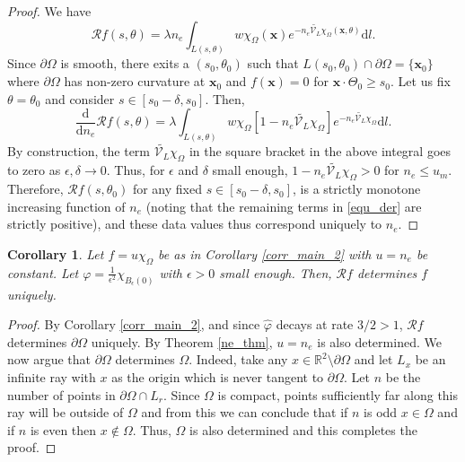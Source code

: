 \documentclass[a4paper,12pt]{amsart}
\numberwithin{equation}{section}
\theoremstyle{plain}
\numberwithin{theorem}{section}
\newtheorem{corollary}[theorem]{Corollary}
\theoremstyle{definition}
\theoremstyle{remark}
\theoremstyle{remark}
\theoremstyle{remark}
\newcommand{\vx}{{\mathbf{x}}}
\newcommand{\seanc}[1]{\begin{quotation}\textbf{Sean's comment:\
}{\textit{#1}}\end{quotation}}
\begin{document}

\begin{proof}
We have
\begin{equation}
\mathcal{R}f(s,\theta) = \lambda n_e\int_{L(s,\theta)}w \chi_\Omega(\vx) e^{-n_e \widetilde{ \mathcal{V}_L }\chi_\Omega(\vx, \theta)}\mathrm{d}l.
\end{equation}
Since $\partial \Omega$ is smooth, there exits a $(s_0,\theta_0)$ such that $L(s_0,\theta_0) \cap \partial \Omega = \{\vx_0\}$ where $\partial \Omega$ has non-zero curvature at $\vx_0$ and $f(\vx) = 0$ for $\vx \cdot \Theta_0 \geq s_0$. Let us fix $\theta = \theta_0$ and consider $s\in [s_0-\delta,s_0]$. Then,
\begin{equation}
\label{equ_der}
\frac{\mathrm{d}}{\mathrm{d}n_e}\mathcal{R}f(s,\theta) = \lambda \int_{L(s,\theta)}w \chi_\Omega\left[1 - n_e\widetilde{ \mathcal{V}_L } \chi_\Omega\right] e^{-n_e \widetilde{ \mathcal{V}_L }\chi_\Omega}\mathrm{d}l.
\end{equation}
By construction, the term $\widetilde{ \mathcal{V}_L }\chi_\Omega$ in the square bracket in the above integral goes to zero as $\epsilon, \delta \to 0$. Thus, for $\epsilon$ and $\delta$ small enough, $1 - n_e \widetilde{ \mathcal{V}_L }\chi_\Omega > 0$ for $n_e \leq u_m$. Therefore, $\mathcal{R}f(s,\theta_0)$ for any fixed $s \in [s_0-\delta,s_0]$, is a strictly monotone increasing function of $n_e$ (noting that the remaining terms in \eqref{equ_der} are strictly positive), and these data values thus correspond uniquely to $n_e$.
\end{proof}

\begin{corollary}
Let $f = u\chi_\Omega$ be as in Corollary \ref{corr_main_2} with $u = n_e$ be constant. Let $\varphi = \frac{1}{\epsilon^2}\chi_{B_\epsilon(0)}$ with $\epsilon > 0$ small enough. Then, $\mathcal{R}f$ determines $f$ uniquely.
\end{corollary}
\begin{proof}
By Corollary \ref{corr_main_2}, and since $\hat{\varphi}$ decays at rate $3/2 > 1$, $\mathcal{R} f$ determines $\partial \Omega$ uniquely. By Theorem \ref{ne_thm}, $u = n_e$ is also determined. We now argue that $\partial \Omega$ determines $\Omega$. Indeed, take any $x \in \mathbb{R}^2\setminus \partial \Omega$ and let $L_x$ be an infinite ray with $x$ as the origin which is never tangent to $\partial \Omega$. Let $n$ be the number of points in $\partial \Omega \cap L_r$.  Since $\Omega$ is compact, points sufficiently far along this ray will be outside of $\Omega$ and from this we can conclude that if $n$ is odd $x \in \Omega$ and if $n$ is even then $x \notin \Omega$. Thus, $\Omega$ is also determined and this completes the proof.
\end{proof}
\end{document}
